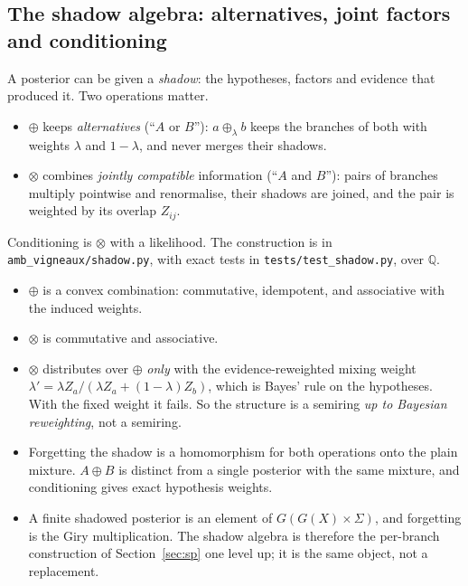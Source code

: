 \documentclass[11pt]{article}
\theoremstyle{definition}
\theoremstyle{remark}
\begin{document}
\subsection{The shadow algebra: alternatives, joint factors and conditioning}\label{sec:shadow}
A posterior can be given a \emph{shadow}: the hypotheses, factors and evidence that produced it. Two operations matter.
\begin{itemize}
  \item $\oplus$ keeps \emph{alternatives} (``$A$ or $B$''): $a\oplus_\lambda b$ keeps the branches of both with weights $\lambda$ and $1-\lambda$, and never merges their shadows.
  \item $\otimes$ combines \emph{jointly compatible} information (``$A$ and $B$''): pairs of branches multiply pointwise and renormalise, their shadows are joined, and the pair is weighted by its overlap $Z_{ij}$.
\end{itemize}
Conditioning is $\otimes$ with a likelihood. The construction is in \texttt{amb\_vigneaux/shadow.py}, with exact tests in \texttt{tests/test\_shadow.py}, over $\mathbb Q$.
\begin{itemize}
  \item $\oplus$ is a convex combination: commutative, idempotent, and associative with the induced weights.
  \item $\otimes$ is commutative and associative.
  \item $\otimes$ distributes over $\oplus$ \emph{only} with the evidence-reweighted mixing weight $\lambda'=\lambda Z_a/(\lambda Z_a+(1-\lambda)Z_b)$, which is Bayes' rule on the hypotheses. With the fixed weight it fails. So the structure is a semiring \emph{up to Bayesian reweighting}, not a semiring.
  \item Forgetting the shadow is a homomorphism for both operations onto the plain mixture. $A\oplus B$ is distinct from a single posterior with the same mixture, and conditioning gives exact hypothesis weights.
  \item A finite shadowed posterior is an element of $G(G(X)\times\Sigma)$, and forgetting is the Giry multiplication. The shadow algebra is therefore the per-branch construction of Section~\ref{sec:sp} one level up; it is the same object, not a replacement.
\end{itemize}
\end{document}
